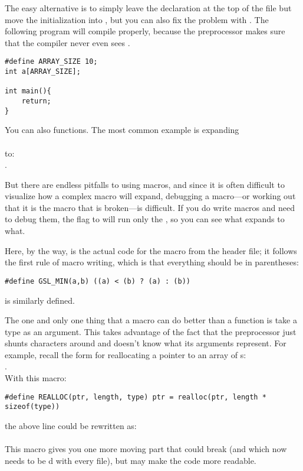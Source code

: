 The easy alternative is to simply leave the declaration at the top of
the file but move the initialization into , but you can also
fix the problem with . The following program will compile
properly, because the preprocessor makes sure that the compiler never
even sees .
\begin{lstlisting}
#define ARRAY_SIZE 10;
int a[ARRAY_SIZE];

int main(){
    return;
}
\end{lstlisting}


You can also  functions. The most common example is expanding\\
\\
to:\\
 .

But there are endless pitfalls to using macros, and since it is often
difficult to visualize how a complex macro will expand, debugging
a macro---or working out that it is the macro that is broken---is
difficult.  If you do write macros and need to debug them, the 
flag to  will run only the , so you can see
what expands to what.

Here, by the way, is the actual code for the  macro from
the  header file;
it follows the first rule of macro writing, which is that everything
should be in parentheses:\\
\begin{lstlisting}
#define GSL_MIN(a,b) ((a) < (b) ? (a) : (b)) 
\end{lstlisting}
  is similarly defined.


The one and only one thing that a macro can do better than a function is
take a type as an argument. This takes advantage of the fact that the preprocessor 
just shunts characters around and doesn't know what its arguments represent.
For example, recall the form for reallocating a pointer to an array of s:\\
.\\
With this macro:
\begin{lstlisting}
#define REALLOC(ptr, length, type) ptr = realloc(ptr, length * sizeof(type))
\end{lstlisting}
the above line could be rewritten as:\\
\\
This macro gives you one more moving part that could break (and which
now needs to be d with every file), but
may make the code more readable.

